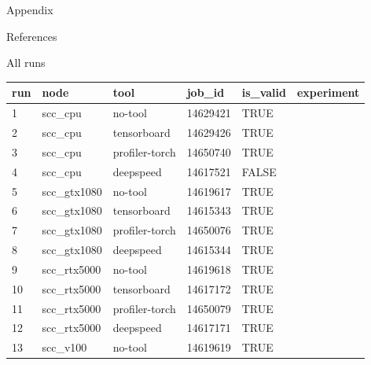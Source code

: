 \documentclass[compress,aspectratio=169]{beamer}
\begin{document}
\begin{frame}
\begin{center}
Appendix
\end{center}
\end{frame}

\begin{frame}{References}
    \renewcommand*{\bibfont}{\normalfont\scriptsize}
    \printbibliography[heading=none]
\end{frame}

\begin{frame}{All runs}
\tiny{
\begin{table}[]
\begin{tabular}{@{}llllll@{}}
\toprule
run & node         & tool           & job\_id  & is\_valid & experiment     \\ \midrule
1   & scc\_cpu     & no-tool        & 14629421 & TRUE      &                \\
2   & scc\_cpu     & tensorboard    & 14629426 & TRUE      &                \\
3   & scc\_cpu     & profiler-torch & 14650740 & TRUE      &                \\
4   & scc\_cpu     & deepspeed      & 14617521 & FALSE     &                \\
5   & scc\_gtx1080 & no-tool        & 14619617 & TRUE      &                \\
6   & scc\_gtx1080 & tensorboard    & 14615343 & TRUE      &                \\
7   & scc\_gtx1080 & profiler-torch & 14650076 & TRUE      &                \\
8   & scc\_gtx1080 & deepspeed      & 14615344 & TRUE      &                \\
9   & scc\_rtx5000 & no-tool        & 14619618 & TRUE      &                \\
10  & scc\_rtx5000 & tensorboard    & 14617172 & TRUE      &                \\
11  & scc\_rtx5000 & profiler-torch & 14650079 & TRUE      &                \\
12  & scc\_rtx5000 & deepspeed      & 14617171 & TRUE      &                \\
13  & scc\_v100    & no-tool        & 14619619 & TRUE      &                \\

\end{tabular}
\end{table}}
\end{frame}
\end{document}
